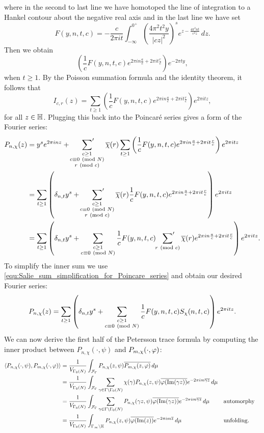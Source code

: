     where in the second to last line we have homotoped the line of integration to a Hankel contour about the negative real axis and in the last line we have set
    \[
      F(y,n,t,c) = -\frac{c}{2\pi it}\int_{-\infty}^{0^{+}}\left(\frac{4\pi^{2}t^{2}y}{|cz|^{2}}\right)^{s}e^{z-\frac{4\pi^{2}nt}{c^{2}z}}\,dz.
    \]
    Then we obtain
    \[
      \left(\frac{1}{c}F(y,n,t,c)e^{2\pi in\frac{a}{c}+2\pi it\frac{r}{c}}\right)e^{-2\pi ty},
    \]
    when $t \ge 1$. By the Poisson summation formula and the identity theorem, it follows that
    \[
      I_{c,r}(z) = \sum_{t \ge 1}\left(\frac{1}{c}F(y,n,t,c)e^{2\pi in\frac{a}{c}+2\pi it\frac{r}{c}}\right)e^{2\pi itz},
    \]
    for all $z \in \mathbb{H}$. Plugging this back into the Poincar\'e series gives a form of the Fourier series:
    \begin{align*}
      P_{n,\chi}(z) &= y^{s}e^{2\pi inz}+\sideset{}{'}\sum_{\substack{c \ge 1 \\ c \equiv 0 \ \left(\text{mod }N\right) \\ r \ \left(\text{mod }c\right)}}\overline{\chi}(r)\sum_{t \ge 1}\left(\frac{1}{c}F(y,n,t,c)e^{2\pi in\frac{a}{c}+2\pi it\frac{r}{c}}\right)e^{2\pi itz} \\
      &= \sum_{t \ge 1}\left(\delta_{n,t}y^{s}+\sideset{}{'}\sum_{\substack{c \ge 1 \\ c \equiv 0 \ \left(\text{mod }N\right) \\ r \ \left(\text{mod }c\right)}}\overline{\chi}(r)\frac{1}{c}F(y,n,t,c)e^{2\pi in\frac{a}{c}+2\pi it\frac{r}{c}}\right)e^{2\pi itz} \\
      &= \sum_{t \ge 1}\left(\delta_{n,t}y^{s}+\sum_{\substack{c \ge 1 \\ c \equiv 0 \ \left(\text{mod }N\right)}}\frac{1}{c}F(y,n,t,c)\sideset{}{'}\sum_{r \ \left(\text{mod }c\right)}\overline{\chi}(r)e^{2\pi in\frac{a}{c}+2\pi it\frac{r}{c}}\right)e^{2\pi itz}.
    \end{align*}
    To simplify the inner sum we use \cref{equ:Salie_sum_simplification_for_Poincare_series} and obtain our desired Fourier series:
    \[
      P_{n,\chi}(z) = \sum_{t \ge 1}\left(\delta_{n,t}y^{s}+\sum_{\substack{c \ge 1 \\ c \equiv 0 \ \left(\text{mod }N\right)}}\frac{1}{c}F(y,n,t,c)S_{\chi}(n,t,c)\right)e^{2\pi itz}.
    \]
    \iffalse
    We can now derive the first half of the Petersson trace formula by computing the inner product between $P_{n,\chi}(\cdot,\psi)$ and $P_{m,\chi}(\cdot,\varphi)$: 
    \begin{align*}
      \langle P_{n,\chi}(\cdot,\psi),P_{m,\chi}(\cdot,\varphi)\rangle &= \frac{1}{V_{\Gamma_{0}(N)}}\int_{\mathcal{F}_{\Gamma}}P_{n,\chi}(z,\psi)\overline{P_{m,\chi}(z,\varphi)}\,d\mu \\
      &= \frac{1}{V_{\Gamma_{0}(N)}}\int_{\mathcal{F}_{\Gamma}}\sum_{\gamma \in \Gamma\backslash\Gamma_{0}(N)}\chi(\gamma)P_{n,\chi}(z,\psi)\overline{\varphi(\mathrm{Im}(\gamma z))}e^{-2\pi im\overline{\gamma z}}\,d\mu \\
      &= \frac{1}{V_{\Gamma_{0}(N)}}\int_{\mathcal{F}_{\Gamma}}\sum_{\gamma \in \Gamma\backslash\Gamma_{0}(N)}P_{n,\chi}(\gamma z,\psi)\overline{\varphi(\mathrm{Im}(\gamma z))}e^{-2\pi im\overline{\gamma z}}\,d\mu && \text{automorphy} \\
      &= \frac{1}{V_{\Gamma_{0}(N)}}\int_{\Gamma_{\infty}\backslash\mathbb{H}}P_{n,\chi}(z,\psi)\overline{\varphi(\mathrm{Im}(z))}e^{-2\pi im\overline{z}}\,d\mu && \text{unfolding}.
    \end{align*}
